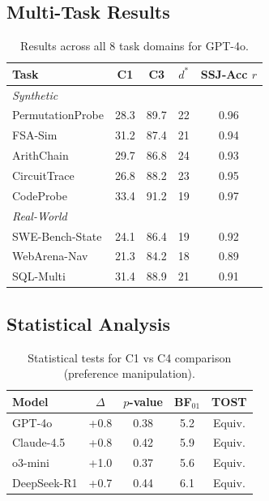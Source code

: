 \documentclass{article}
\theoremstyle{plain}
\theoremstyle{definition}
\theoremstyle{remark}
\begin{document}
\subsection{Multi-Task Results}

\begin{table}[h]
\centering
\caption{Results across all 8 task domains for GPT-4o.}
\label{tab:multitask}
\small
\begin{tabular}{@{}lcccc@{}}
\toprule
\textbf{Task} & \textbf{C1} & \textbf{C3} & \textbf{$d^*$} & \textbf{SSJ-Acc $r$} \\
\midrule
\multicolumn{5}{l}{\textit{Synthetic}} \\
PermutationProbe & 28.3 & 89.7 & 22 & 0.96 \\
FSA-Sim & 31.2 & 87.4 & 21 & 0.94 \\
ArithChain & 29.7 & 86.8 & 24 & 0.93 \\
CircuitTrace & 26.8 & 88.2 & 23 & 0.95 \\
CodeProbe & 33.4 & 91.2 & 19 & 0.97 \\
\midrule
\multicolumn{5}{l}{\textit{Real-World}} \\
SWE-Bench-State & 24.1 & 86.4 & 19 & 0.92 \\
WebArena-Nav & 21.3 & 84.2 & 18 & 0.89 \\
SQL-Multi & 31.4 & 88.9 & 21 & 0.91 \\
\bottomrule
\end{tabular}
\end{table}

\subsection{Statistical Analysis}

\begin{table}[h]
\centering
\caption{Statistical tests for C1 vs C4 comparison (preference manipulation).}
\label{tab:stats}
\small
\begin{tabular}{@{}lcccc@{}}
\toprule
\textbf{Model} & \textbf{$\Delta$} & \textbf{$p$-value} & \textbf{BF$_{01}$} & \textbf{TOST} \\
\midrule
GPT-4o & +0.8 & 0.38 & 5.2 & Equiv. \\
Claude-4.5 & +0.8 & 0.42 & 5.9 & Equiv. \\
o3-mini & +1.0 & 0.37 & 5.6 & Equiv. \\
DeepSeek-R1 & +0.7 & 0.44 & 6.1 & Equiv. \\
\bottomrule
\end{tabular}
\end{table}
\end{document}
